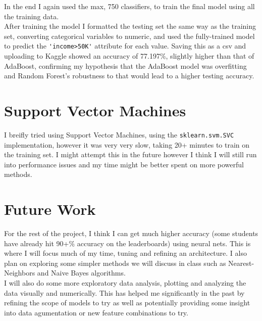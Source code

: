 \documentclass{article}
\begin{document}
        In the end I again used the max, 750 classifiers, to train the final model using all the training data. \\

        After training the model I formatted the testing set the same way as the training set, converting categorical variables to numeric, and used the fully-trained model to predict the \lstinline{'income>50K'} attribute for each value. Saving this as a csv and uploading to Kaggle showed an accuracy of 77.197\%, slightly higher than that of AdaBoost, confirming my hypothesis that the AdaBoost model was overfitting and Random Forest's robustness to that would lead to a higher testing accuracy.
    
    \section{Support Vector Machines}
        I breifly tried using Support Vector Machines, using the \lstinline{sklearn.svm.SVC} implementation, however it was very very slow, taking 20+ minutes to train on the training set. I might attempt this in the future however I think I will still run into performance issues and my time might be better spent on more powerful methods.

    \section{Future Work}
        For the rest of the project, I think I can get much higher accuracy (some students have already hit 90+\% accuracy on the leaderboards) using neural nets. This is where I will focus much of my time, tuning and refining an architecture. I also plan on exploring some simpler methods we will discuss in class such as Nearest-Neighbors and Naive Bayes algorithms. \\

        I will also do some more exploratory data analysis, plotting and analyzing the data visually and numerically. This has helped me significantly in the past by refining the scope of models to try as well as potentially providing some insight into data agumentation or new feature combinations to try.
\end{document}
